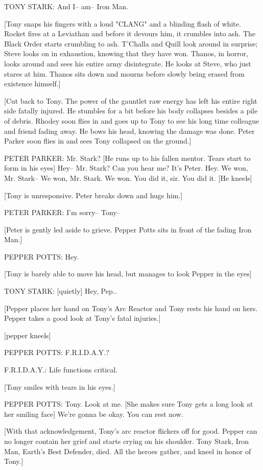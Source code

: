 TONY STARK: And I– am– Iron Man.

[Tony snaps his fingers with a loud "CLANG" and a blinding flash of white. Rocket fires at a Leviathan and before it devours him, it crumbles into ash. The Black Order starts crumbling to ash. T'Challa and Quill look around in surprise; Steve looks on in exhaustion, knowing that they have won. Thanos, in horror, looks around and sees his entire army disintegrate. He looks at Steve, who just stares at him. Thanos sits down and mourns before slowly being erased from existence himself.]

[Cut back to Tony. The power of the gauntlet raw energy has left his entire right side fatally injured. He stumbles for a bit before his body collapses besides a pile of debris. Rhodey soon flies in and goes up to Tony to see his long time colleague and friend fading away. He bows his head, knowing the damage was done. Peter Parker soon flies in and sees Tony collapsed on the ground.]

PETER PARKER: Mr. Stark? [He runs up to his fallen mentor. Tears start to form in his eyes] Hey– Mr. Stark? Can you hear me? It's Peter. Hey. We won, Mr. Stark– We won, Mr. Stark. We won. You did it, sir. You did it. [He kneels]

[Tony is unresponsive. Peter breaks down and hugs him.]

PETER PARKER: I'm sorry– Tony–

[Peter is gently led aside to grieve. Pepper Potts sits in front of the fading Iron Man.]

PEPPER POTTS: Hey.

[Tony is barely able to move his head, but manages to look Pepper in the eyes]

TONY STARK: [quietly] Hey, Pep..

[Pepper places her hand on Tony's Arc Reactor and Tony rests his hand on hers. Pepper takes a good look at Tony's fatal injuries.]

[pepper kneels]

PEPPER POTTS: F.R.I.D.A.Y.?

F.R.I.D.A.Y.: Life functions critical.

[Tony smiles with tears in his eyes.]

PEPPER POTTS: Tony. Look at me. [She makes sure Tony gets a long look at her smiling face] We're gonna be okay. You can rest now.

[With that acknowledgement, Tony's arc reactor flickers off for good. Pepper can no longer contain her grief and starts crying on his shoulder. Tony Stark, Iron Man, Earth's Best Defender, died. All the heroes gather, and kneel in honor of Tony.]

